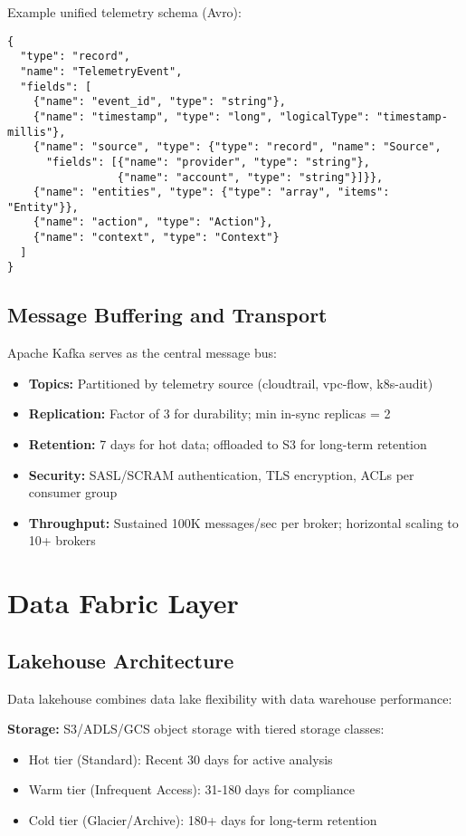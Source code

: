 Example unified telemetry schema (Avro):
\begin{verbatim}
{
  "type": "record",
  "name": "TelemetryEvent",
  "fields": [
    {"name": "event_id", "type": "string"},
    {"name": "timestamp", "type": "long", "logicalType": "timestamp-millis"},
    {"name": "source", "type": {"type": "record", "name": "Source",
      "fields": [{"name": "provider", "type": "string"},
                 {"name": "account", "type": "string"}]}},
    {"name": "entities", "type": {"type": "array", "items": "Entity"}},
    {"name": "action", "type": "Action"},
    {"name": "context", "type": "Context"}
  ]
}
\end{verbatim}

\subsection{Message Buffering and Transport}
Apache Kafka serves as the central message bus:
\begin{itemize}
    \item \textbf{Topics:} Partitioned by telemetry source (cloudtrail, vpc-flow, k8s-audit)
    \item \textbf{Replication:} Factor of 3 for durability; min in-sync replicas = 2
    \item \textbf{Retention:} 7 days for hot data; offloaded to S3 for long-term retention
    \item \textbf{Security:} SASL/SCRAM authentication, TLS encryption, ACLs per consumer group
    \item \textbf{Throughput:} Sustained 100K messages/sec per broker; horizontal scaling to 10+ brokers
\end{itemize}

\section{Data Fabric Layer}\label{sec:arch-datafabric}
\subsection{Lakehouse Architecture}
Data lakehouse combines data lake flexibility with data warehouse performance:

\textbf{Storage:} S3/ADLS/GCS object storage with tiered storage classes:
\begin{itemize}
    \item Hot tier (Standard): Recent 30 days for active analysis
    \item Warm tier (Infrequent Access): 31-180 days for compliance
    \item Cold tier (Glacier/Archive): 180+ days for long-term retention
\end{itemize}

